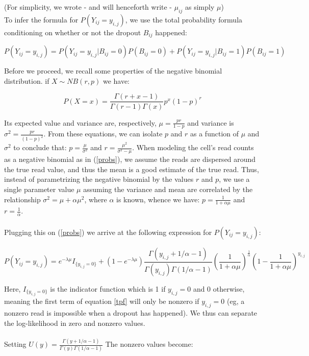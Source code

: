 \documentclass[11pt]{article}
\begin{document}
(For simplicity, we wrote - and will henceforth write - $\mu_{ij}$ as simply $\mu$)\\
To infer the formula for $P(Y_{ij} = y_{i,j})$, we use the total probability formula conditioning on whether or not the dropout $B_{ij}$ happened:

\begin{equation} \label{tpf}
P(Y_{ij} = y_{i,j}) = P(Y_{ij} = y_{i,j} | B_{ij} = 0) P(B_{ij} = 0) + P(Y_{ij} = y_{i,j} | B_{ij} = 1)P (B_{ij} = 1)
\end{equation}

Before we proceed, we recall some properties of the negative binomial distribution. if $X \sim NB (r, p)$ we have:

\begin{equation} \label{probs}
P(X = x) = \frac{\Gamma(r+x-1)}{\Gamma(r-1) \Gamma(x)} p^x (1-p)^r
\end{equation}

Its expected value and variance are, respectively, $\mu = \frac{pr}{1-p}$ and variance is $\sigma^2 = \frac{pr}{(1-p)^2}$. From these equations, we can isolate $p$ and $r$ as a function of $\mu$ and $\sigma^2$ to conclude that: $p = \frac{\mu}{\sigma^2}$ and $r = \frac{\mu^2}{\sigma^2 - \mu}$. When modeling the cell's read counts as a negative binomial as in (\ref{probs}), we assume the reads are dispersed around the true read value, and thus the mean is a good estimate of the true read. Thus, instead of parametrizing the negative binomial by the values $r$ and $p$, we use a single parameter value $\mu$ assuming the variance and mean are correlated by the relationship $\sigma^2 = \mu + \alpha \mu^2$, where $\alpha$ is known, whence we have: $p = \frac{1}{1+ \alpha\mu}$ and $r = \frac{1}{\alpha}$. \\
\\
Plugging this on (\ref{probs}) we arrive at the following expression for $P(Y_{ij} = y_{i,j})$:

$$
 P(Y_{ij} = y_{i,j}) = e^{-\lambda \mu}I_{\{y_{i,j} = 0\}} + (1 - e^{-\lambda \mu}) \frac{\Gamma (y_{i,j} + 1/\alpha - 1)}{\Gamma (y_{i,j}) \Gamma (1/\alpha - 1)} \left(\frac{1}{1+\alpha\mu}\right)^{\frac{1}{\alpha}} \left(1 - \frac{1}{1+ \alpha\mu}\right)^{y_{i,j}}
$$

Here, $I_{\{y_{i,j} = 0\}}$ is the indicator function which is 1 if $y_{i,j} = 0$ and 0 otherwise, meaning the first term of equation \ref{tpf} will only be nonzero if $y_{i,j} = 0$ (eg, a nonzero read is impossible when a dropout has happened). We thus can separate the log-likelihood in zero and nonzero values. \\
\\
Setting $U(y) = \frac{\Gamma(y+1/\alpha-1)}{\Gamma(y)\Gamma(1/\alpha - 1)}$ The nonzero values become:
\end{document}
